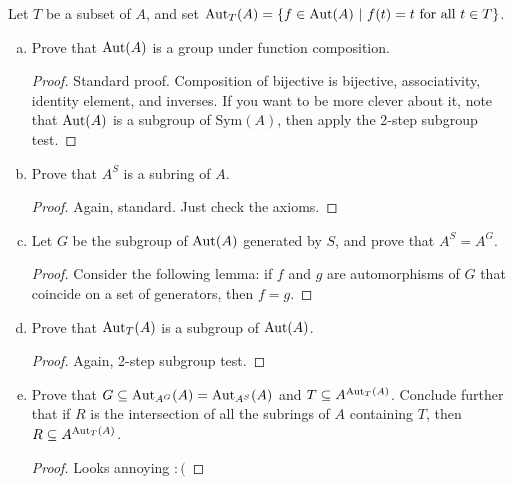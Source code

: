 \begin{itemize}
\medskip 

Let $T$ be a subset of $A$, and set $\Aut_T(A) = \{f \in \Aut(A) \ | \ f(t) = t \text{ for all } t \in T \}$.
\begin{enumerate}[(a)]
    \item Prove that $\operatorname{Aut}(A)$ is a group under function composition.
    \begin{proof}
    Standard proof. Composition of bijective is bijective, associativity, identity element, and inverses. If you want to be more clever about it, note that $\operatorname{Aut}(A)$ is a subgroup of $\text{Sym}(A)$, then apply the 2-step subgroup test.
    \end{proof}
    
    \item Prove that $A^S$ is a subring of $A$.
    \begin{proof}
    Again, standard. Just check the axioms.
    \end{proof}
    
    \item Let $G$ be the subgroup of $\operatorname{Aut}(A)$ generated by $S$, and prove that $A^S = A^G$.
    \begin{proof}
    Consider the following lemma: if $f$ and $g$ are automorphisms of $G$ that coincide on a set of generators, then $f=g$.
    \end{proof}
    
    \item Prove that $\operatorname{Aut}_T(A)$ is a subgroup of $\operatorname{Aut}(A)$.
    \begin{proof}
    Again, 2-step subgroup test.
    \end{proof}
    
    \item Prove that $G \subseteq \operatorname{Aut}_{A^G}(A) = \operatorname{Aut}_{A^S} (A)$ and $T \subseteq A^{\operatorname{Aut}_T(A)}$. Conclude further that if $R$ is the intersection of all the subrings of $A$ containing $T$, then $R \subseteq A^{\operatorname{Aut}_T(A)}$.
    \begin{proof}
    Looks annoying $:($
    \end{proof}
\end{enumerate}











\end{itemize}